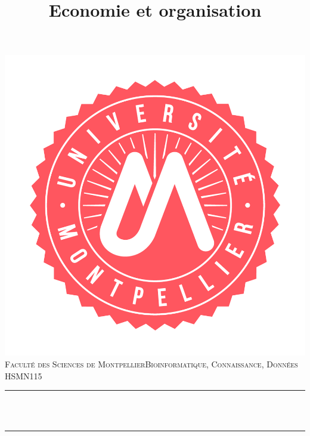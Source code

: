 \documentclass[12pt]{article}
\title{Economie et organisation }								%
\author{}								%
\date{}											%
\makeatletter
\let\thetitle\@title
\makeatother
\begin{document}

\begin{titlepage}
	\centering
    \vspace*{0.5 cm}
    \includegraphics[scale = 0.20]{logo.png}\\[1.0 cm]
    \textsc{\LARGE Faculté des Sciences de Montpellier\newline\newline Bioinformatique, Connaissance, Données}\\[2.0 cm]	%
	\textsc{\Large HSMN115}\\[0.5 cm]				%
	\rule{\linewidth}{0.2 mm} \\[0.4 cm]
	{ \huge \bfseries \thetitle}\\
	\rule{\linewidth}{0.2 mm} \\[1.5 cm]
	

	
	
    
    
    
    
	
\end{titlepage}

\end{document}
